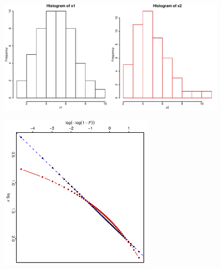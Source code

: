 \begin{frame}   %
\begin{figure}[h]
   \includegraphics[width=4.5in]{hist1.pdf} %
   \vspace{-3ex}
\end{figure}
\end{frame}
\begin{frame}   %
\begin{figure}[h]
   \includegraphics[width=3.0in,angle=90]{Weibull1.pdf} %
   \vspace{-3ex}
\end{figure}
\end{frame}


